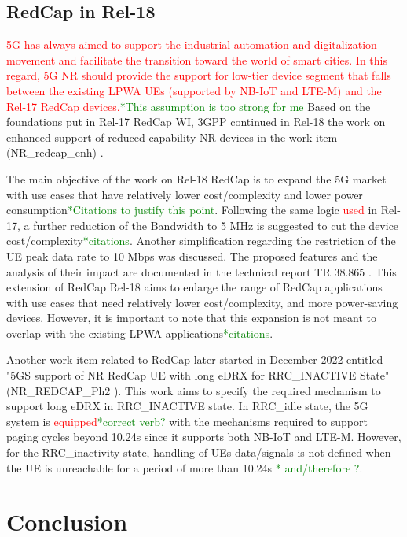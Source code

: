 \documentclass[]{IEEEtran}
\newcommand{\CAREPL}[2]{\textcolor{red}{#1}\textcolor{green}{#2}}
\begin{document}
\subsection{RedCap in Rel-18}
\CAREPL{5G has always aimed to support the industrial automation and digitalization movement and facilitate the transition toward the world of smart cities. In this regard, 5G NR should provide the support for low-tier device segment that falls between the existing LPWA UEs (supported by NB-IoT and LTE-M) and the Rel-17 RedCap devices.}{*This assumption is too strong for me}
Based on the foundations put in Rel-17 RedCap WI, 3GPP continued in Rel-18 the work on enhanced support of reduced capability NR devices in the work item (NR\_redcap\_enh) \cite{3gpp_revised_2022_RP-223544}.

The main objective of the work on Rel-18 RedCap is to expand the 5G market with use cases that have relatively lower cost/complexity and lower power consumption\CAREPL{}{*Citations to justify this point}. 
Following the same logic \CAREPL{used}{} in Rel-17, a further reduction of the Bandwidth to 5 MHz is suggested to cut the device cost/complexity\CAREPL{}{*citations}. 
Another simplification regarding the restriction of the UE peak data rate to 10 Mbps was discussed. The proposed features and the analysis of their impact are documented in the technical report TR 38.865 \cite{3gpp_study_2022_38.865}. This extension of RedCap Rel-18 aims to enlarge the range of RedCap applications with use cases that need relatively lower cost/complexity, and more power-saving devices. However, it is important to note that this expansion is not meant to overlap with the existing LPWA applications\CAREPL{}{*citations}.

Another work item related to RedCap later started in December 2022 entitled "5GS support of NR RedCap UE with long eDRX for RRC\_INACTIVE State" (NR\_REDCAP\_Ph2 \cite{3gpp_5gs_2022_SP-220803}). 
This work aims to specify the required mechanism to support long eDRX in RRC\_INACTIVE state. In RRC\_idle state, the 5G system is \CAREPL{equipped}{*correct verb?} with the mechanisms required to support paging cycles beyond 10.24s since it supports both NB-IoT and LTE-M. 
However, for the RRC\_inactivity state, handling of UEs data/signals is not defined when the UE is unreachable for a period of more than 10.24s \CAREPL{}{* and/therefore ?}.




\section{Conclusion}
\label{sec:7-3}



\end{document}
